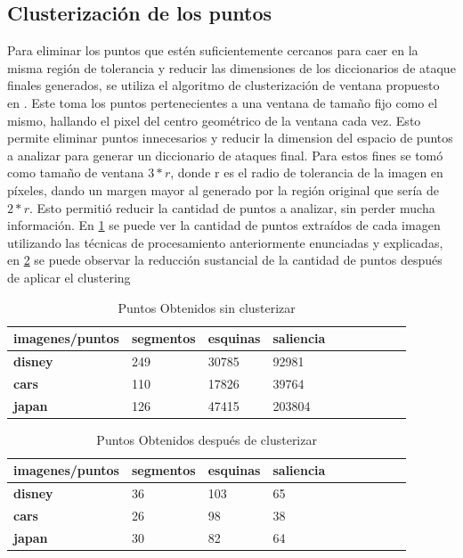 \subsection{Clusterizaci\'on de los puntos }
Para eliminar los puntos que est\'en suficientemente cercanos para caer en la misma regi\'on de tolerancia y reducir las dimensiones de los diccionarios de ataque finales generados, se utiliza el algoritmo de clusterizaci\'on de ventana propuesto en \cite{van2010purely}. Este toma los puntos pertenecientes a una ventana de tama\~no fijo como el mismo, hallando el pixel del centro geom\'etrico de la ventana cada vez. Esto permite eliminar puntos innecesarios y reducir la dimension del espacio de puntos a analizar para generar un diccionario de ataques final. Para estos fines se tom\'o como tama\~no de ventana $3*r$, donde r es el radio de tolerancia de la imagen en p\'ixeles, dando un margen mayor al generado por la regi\'on original que ser\'ia de $2*r$. Esto permiti\'o reducir la cantidad de puntos a analizar, sin perder mucha informaci\'on. En \ref{points:void} se puede ver la cantidad de puntos extra\'idos de cada imagen utilizando las t\'ecnicas de procesamiento anteriormente enunciadas y explicadas, en \ref{points:cluster} se puede observar la reducci\'on sustancial de la cantidad de puntos despu\'es de aplicar el clustering
\begin{table}[!ht]
	\centering
	\caption{Puntos Obtenidos sin clusterizar}
	\label{points:void}
	\begin{tabular}{|l|l|l|l|l|l|l|l|l|l|}
		\hline
		\textbf{imagenes/puntos} & \textbf{segmentos } & \textbf{esquinas} & \textbf{saliencia}
		\\ \hline
		\textbf{disney} & 249 & 30785 & 92981 \\ \hline
		\textbf{cars} & 110 & 17826 & 39764 \\ \hline
		\textbf{japan} & 126 & 47415 & 203804  \\ \hline
	
	\end{tabular}
\end{table}

\begin{table}[!ht]
	\centering
	\caption{Puntos Obtenidos despu\'es de clusterizar}
		\label{points:cluster}
	\begin{tabular}{|l|l|l|l|l|l|l|l|l|l|}
		\hline
		\textbf{imagenes/puntos} & \textbf{segmentos} & \textbf{esquinas} & \textbf{saliencia }  \\ \hline
		\textbf{disney} & 36 & 103 & 65  \\ \hline
		\textbf{cars} & 26 & 98 & 38  \\ \hline
		\textbf{japan} & 30 & 82 & 64 \\ \hline
	\end{tabular}
\end{table}